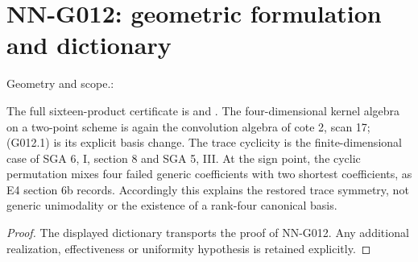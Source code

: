\section{NN-G012: geometric formulation and dictionary}
\begin{geometricstatement}[NN-G012]
Geometry and scope.:

The full sixteen-product certificate is
 and
. The four-dimensional
kernel algebra on a two-point scheme is again the convolution
algebra of cote 2, scan 17; (G012.1) is its explicit basis change.
The trace cyclicity is the finite-dimensional case of SGA 6,
I, section 8 and SGA 5, III. At the sign point, the cyclic
permutation mixes four failed generic coefficients with two
shortest coefficients, as E4 section 6b records. Accordingly
this explains the restored trace symmetry, not generic
unimodality or the existence of a rank-four canonical basis.


\end{geometricstatement}
\begin{proof} The displayed dictionary transports the proof of NN-G012. Any additional realization, effectiveness or uniformity hypothesis is retained explicitly.\end{proof}


